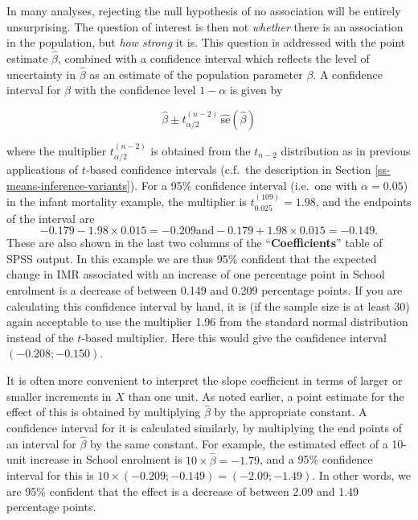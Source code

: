 \documentclass[11pt,a4paper,openany]{book}
\begin{document}
In many analyses, rejecting the null hypothesis of no association will
be entirely unsurprising. The question of interest is then not
\emph{whether} there is an association in the population, but \emph{how
strong} it is. This question is addressed with the point estimate
\(\hat{\beta}\), combined with a confidence interval which reflects the
level of uncertainty in \(\hat{\beta}\) as an estimate of the population
parameter \(\beta\). A confidence interval for \(\beta\) with the
confidence level \(1-\alpha\) is given by

\begin{equation}\hat{\beta} \pm t_{\alpha/2}^{(n-2)} \, \hat{\text{se}}(\hat{\beta})
\label{eq:cibeta}\end{equation}

where the multiplier \(t_{\alpha/2}^{(n-2)}\) is obtained from the
\(t_{n-2}\) distribution as in previous applications of \(t\)-based
confidence intervals (c.f.~the description in Section
\ref{ss-means-inference-variants}). For a 95\% confidence interval
(i.e.~one with \(\alpha=0.05\)) in the infant mortality example, the
multiplier is \(t_{0.025}^{(109)}=1.98\), and the endpoints of the
interval are \[-0.179-1.98\times 0.015=-0.209  \text{and}
-0.179+1.98\times 0.015=-0.149.\] These are also shown in the last two
columns of the ``\textbf{Coefficients}'' table of SPSS output. In this
example we are thus 95\% confident that the expected change in IMR
associated with an increase of one percentage point in School enrolment
is a decrease of between 0.149 and 0.209 percentage points. If you are
calculating this confidence interval by hand, it is (if the sample size
is at least 30) again acceptable to use the multiplier 1.96 from the
standard normal distribution instead of the \(t\)-based multiplier. Here
this would give the confidence interval \((-0.208; -0.150)\).

It is often more convenient to interpret the slope coefficient in terms
of larger or smaller increments in \(X\) than one unit. As noted
earlier, a point estimate for the effect of this is obtained by
multiplying \(\hat{\beta}\) by the appropriate constant. A confidence
interval for it is calculated similarly, by multiplying the end points
of an interval for \(\hat{\beta}\) by the same constant. For example,
the estimated effect of a 10-unit increase in School enrolment is
\(10\times \hat{\beta}=-1.79\), and a 95\% confidence interval for this
is \(10\times (-0.209; -0.149)=(-2.09; -1.49)\). In other words, we are
95\% confident that the effect is a decrease of between 2.09 and 1.49
percentage points.
\end{document}
